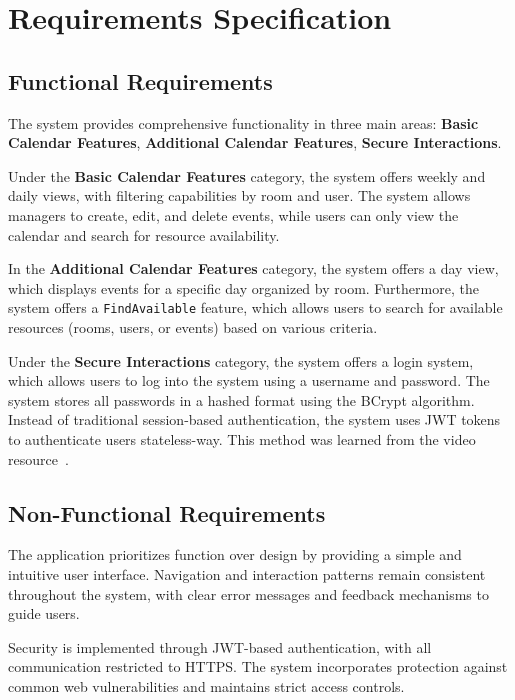 \section{Requirements Specification}\label{sec:requirements-specification}

\subsection{Functional Requirements}\label{subsec:functional-requirements}
The system provides comprehensive functionality in three main areas: \textbf{Basic Calendar Features}, \textbf{Additional Calendar Features}, \textbf{Secure Interactions}.

Under the \textbf{Basic Calendar Features} category, the system offers weekly and daily views, with filtering capabilities by room and user.
The system allows managers to create, edit, and delete events, while users can only view the calendar and search for resource availability.

In the \textbf{Additional Calendar Features} category, the system offers a day view, which displays events for a specific day organized by room.
Furthermore, the system offers a \texttt{FindAvailable} feature, which allows users to search for available resources (rooms, users, or events) based on various criteria.

Under the \textbf{Secure Interactions} category, the system offers a login system, which allows users to log into the system using a username and password.
The system stores all passwords in a hashed format using the BCrypt algorithm.
Instead of traditional session-based authentication, the system uses JWT tokens to authenticate users stateless-way.
This method was learned from the video resource~\cite{Amigoscode2023}.

\subsection{Non-Functional Requirements}\label{subsec:non-functional-requirements}

The application prioritizes function over design by providing a simple and intuitive user interface.
Navigation and interaction patterns remain consistent throughout the system, with clear error messages and feedback mechanisms to guide users.

Security is implemented through JWT-based authentication, with all communication restricted to HTTPS. The system incorporates protection against common web vulnerabilities and maintains strict access controls.

